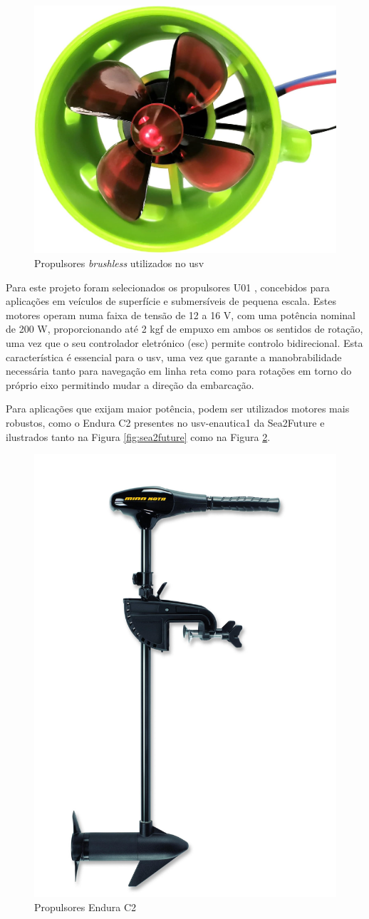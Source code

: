 \begin{figure}[H]
    \centering
    \includegraphics[width=0.33\linewidth]{figuras/thrusters.jpg}
    \caption{Propulsores \emph{brushless} utilizados no \gls{usv}}
    \label{fig:thrusters}
\end{figure}

Para este projeto foram selecionados os propulsores U01 \cite{apisqueen-underwater-thruster}, concebidos para aplicações em veículos de superfície e submersíveis de pequena escala. Estes motores operam numa faixa de tensão de 12 a 16 V, com uma potência nominal de 200 W, proporcionando até 2 kgf de empuxo em ambos os sentidos de rotação, uma vez que o seu controlador eletrónico (\gls{esc}) permite controlo bidirecional. Esta característica é essencial para o \gls{usv}, uma vez que garante a manobrabilidade necessária tanto para navegação em linha reta como para rotações em torno do próprio eixo permitindo mudar a direção da embarcação.

Para aplicações que exijam maior potência, podem ser utilizados motores mais robustos, como o Endura C2 \cite{datasheet-endura-c2} presentes no \gls{usv}-enautica1 da Sea2Future \cite{sea2future} \cite{sea2future2} e ilustrados tanto na Figura \ref{fig:sea2future} como na Figura \ref{fig:endura-c2}.

\begin{figure}[H]
    \centering
    \includegraphics[width=0.33\linewidth]{figuras/endura-c2.jpg}
    \caption[Propulsores Endura C2]{Propulsores Endura C2 \cite{datasheet-endura-c2}}
    \label{fig:endura-c2}
\end{figure}

